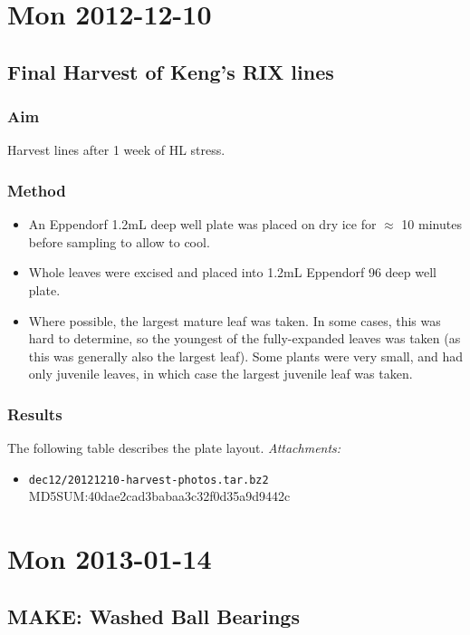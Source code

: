 \documentclass[12pt,a4paper]{book}
\begin{document}
\chapter*{Mon 2012-12-10}
  \section*{Final Harvest of Keng's RIX lines}
    \subsection*{Aim}
      Harvest lines after 1 week of HL stress.
    \subsection*{Method}
      \begin{itemize} \itemsep1pt \parskip0pt 
        \item An Eppendorf 1.2mL deep well plate was placed on dry ice for $\approx$ 10 minutes before
          sampling to allow to cool.
        \item Whole leaves were excised and placed into 1.2mL Eppendorf 96 deep well plate.
        \item Where possible, the largest mature leaf was taken. In some cases, this was hard to
          determine, so the youngest of the fully-expanded leaves was taken (as this was generally
          also the largest leaf). Some plants were very small, and had only juvenile leaves, in which
          case the largest juvenile leaf was taken.
      \end{itemize}
    \subsection*{Results}
    The following table describes the plate layout.
    \emph{Attachments:}
    \begin{itemize} \itemsep1pt \parskip0pt 
      \item \verb+dec12/20121210-harvest-photos.tar.bz2+ \hfill MD5SUM:40dae2cad3babaa3c32f0d35a9d9442c
    \end{itemize}

\chapter*{Mon 2013-01-14}
  \section*{MAKE: Washed Ball Bearings}
\end{document}
